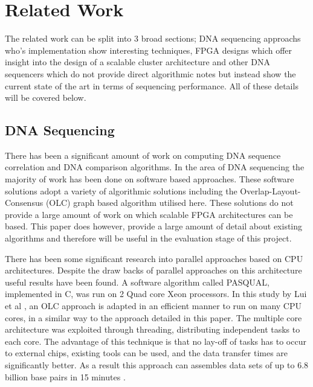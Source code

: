 \chapter{Related Work}
\renewcommand{\baselinestretch}{\mystretch}
\label{chap:relwork}


The related work can be split into 3 broad sections; DNA sequencing approachs who's implementation show interesting techniques, FPGA designs which offer insight into the design of a scalable cluster architecture and other DNA sequencers which do not provide direct algorithmic notes but instead show the current state of the art in terms of sequencing performance. All of these details will be covered below. 


\section{DNA Sequencing}

There has been a significant amount of work on computing DNA sequence correlation and DNA comparison algorithms.
In the area of DNA sequencing the majority of work has been done on software based approaches\cite{zhang2011practical}. These software solutions adopt a variety of algorithmic solutions including the Overlap-Layout-Consensus (OLC) graph based algorithm utilised here. These solutions do not provide a large amount of work on which scalable FPGA architectures can be based. This paper \cite{zhang2011practical} does however, provide a large amount of detail about existing algorithms and therefore will be useful in the evaluation stage of this project. 



There has been some significant research into parallel approaches based on CPU architectures. Despite the draw backs of parallel approaches on this architecture useful results have been found. A software algorithm called PASQUAL, implemented in C, was run on 2 Quad core Xeon processors. In this study by Lui et al \cite{liu2012pasqual}, an OLC approach is adapted in an efficient manner to run on many CPU cores, in a similar way to the approach detailed in this paper. The multiple core architecture was exploited through threading, distributing independent tasks to each core. The advantage of this technique is that no lay-off of tasks has to occur to external chips, existing tools can be used, and the data transfer times are significantly better. As a result this approach can assembles data sets of up to 6.8 billion base pairs in 15 minutes \cite{liu2012pasqual}.



